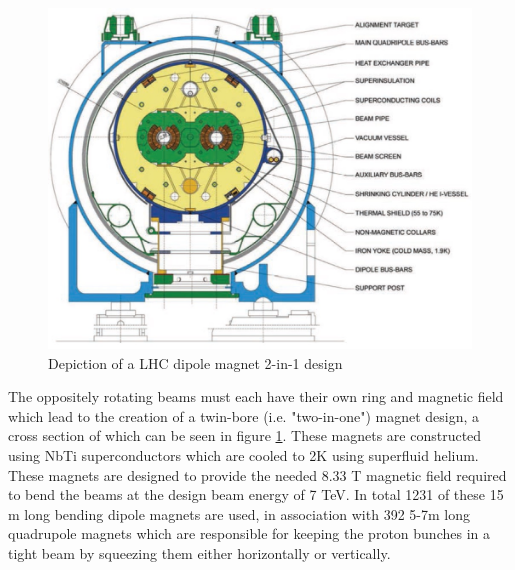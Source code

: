 \begin{figure}[!htbp] 
  \begin{center}
    \includegraphics[width=0.9\linewidth]{figures/lhc/dipole.jpg}
    \caption{ Depiction of a LHC dipole magnet 2-in-1 design} 
    \label{fig:dipole} 
  \end{center} 
\end{figure}

The oppositely rotating beams must each  have their own ring and magnetic field
which lead to the creation of a twin-bore (i.e. "two-in-one") magnet design, a
cross section of which can be seen in figure \ref{fig:dipole}. These magnets are constructed
using NbTi superconductors which are cooled to 2K using superfluid helium.
These magnets are designed to provide the needed 8.33 T magnetic field required
to bend the beams at the design beam energy of 7 TeV.  In total 1231 of these 15
m long bending dipole magnets are used, in association with 392 5-7m long
quadrupole magnets which are responsible for keeping the proton bunches in a
tight beam by squeezing them either horizontally or vertically.
